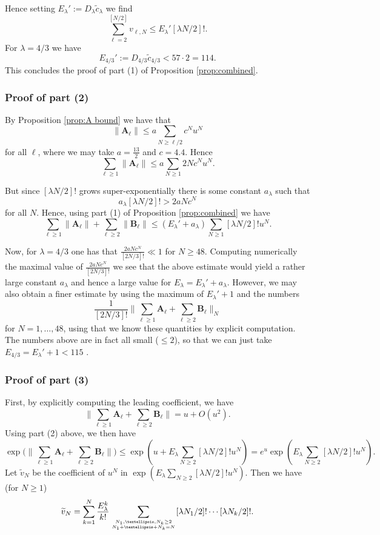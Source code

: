 \documentclass[12pt]{amsart}
\theoremstyle{definition}
\numberwithin{equation}{section}
\renewcommand{\tilde}{\widetilde}
\newcommand{\bA}{\mathbf{A}}
\newcommand{\bB}{\mathbf{B}}
\newcommand{\numcheck}[1]{\cite[Computation #1]{SupplementaryNotebook}}
\theoremstyle{definition} %
\theoremstyle{remark}
\begin{document}
Hence setting $E_\lambda':=D_\lambda  \tilde c_\lambda$ we find 
\[
    \sum_{\ell = 2}^{[N/2]} v_{\ell,N}\leq E_\lambda' [\lambda N/2]!.
\]
For $\lambda=4/3$ we have 
\[
    E_{4/3}':=D_{4/3}  \tilde c_{4/3} < 57 \cdot 2 = 114.
\]
This concludes the proof of part (1) of Proposition \ref{prop:combined}.


\subsubsection*{Proof of part (2)}
By Proposition \ref{prop:A bound} we have that 
\[
\|\bA_\ell\| \leq a \sum_{N\geq \ell/2} c^N u^N
\]
for all $\ell$, where we may take $a=\frac{13}{2}$ and $c=4.4$. 
Hence 
\[
\sum_{\ell\geq 1} \|\bA_\ell\| \leq a \sum_{N\geq 1}  2N c^N u^N.
\]

But since $[\lambda N/2]!$ grows super-exponentially there is some constant $a_\lambda$ such that
\[
a_\lambda[\lambda N/2]! > 2 a N c^N
\]
for all $N$.
Hence, using part (1) of Proposition \ref{prop:combined} we have
\[
\sum_{\ell\geq 1} \|\bA_\ell\| + \sum_{\ell\geq 2} \|\bB_\ell\|
\leq 
(E_\lambda'+a_\lambda)
\sum_{N\geq 1} [\lambda N/2]! u^N.
\]

Now, for $\lambda=4/3$ one has that $\frac{2 aN  c^N}{[2N/3]!}\ll 1$ for $N\geq 48$. 
Computing numerically the maximal value of $\frac{2aN c^N}{[2N/3]!}$ we see that the above estimate would yield a rather large constant $a_\lambda$ and hence a large value for $E_\lambda = E_\lambda'+a_\lambda$. 
However, we may also obtain a finer estimate by using the maximum of $E_\lambda'+1$ and the numbers
\[
    \frac1{[2N/3]!}\Big\|\sum_{\ell\geq 1} \bA_\ell + \sum_{\ell\geq 2} \bB_\ell\Big\|_N 
\]
for $N=1,\dots,48$, using that we know these quantities by explicit computation.
The numbers above are in fact all small ($\leq 2$), so that we can just take $E_{4/3}=E_\lambda'+1<115$ \numcheck{ELAMBDA}.

\subsubsection*{Proof of part (3)}
First, by explicitly computing the leading coefficient, we have
\[
    \big\|\sum_{\ell\geq 1} \bA_\ell +\sum_{\ell\geq 2}\bB_\ell \big\| = u + O(u^2).
\]
Using part (2) above, we then have
\begin{equation} \label{1} \exp\Big(\big\|\sum_{\ell\geq 1} \bA_\ell +\sum_{\ell\geq 2}\bB_\ell \big\| \Big) \leq 
\exp(u+E_\lambda \sum_{N\geq 2}[\lambda N/2]! u^N)
=
e^u \exp(E_\lambda \sum_{N\geq 2}[\lambda N/2]! u^N).
\end{equation}
Let $\tilde v_{N}$ be the coefficient of $u^N$ in $\exp(E_\lambda \sum_{N\geq 2}[\lambda N/2]! u^N)$.
Then we have (for $N\geq 1$)
\begin{equation} \label{vt1}
    \tilde v_{N}
    =
    \sum_{k=1}^N
\frac {E_\lambda^k} {k!} 
\sum_{N_1,\dots,N_k \geq 2\atop N_1+\dots+N_k =N}
[\lambda N_1/2]! \cdots [\lambda N_k/2]!.
\end{equation}
\end{document}
